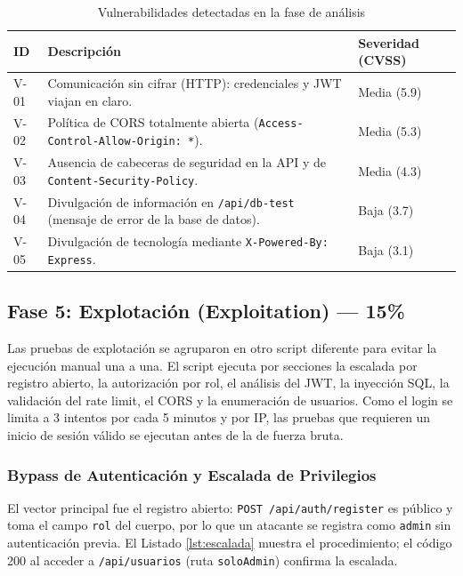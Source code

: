 \documentclass[stu,11pt,spanish,floatsintext]{apa7}
\begin{document}
\begin{table}[H]
  \centering
  \caption{Vulnerabilidades detectadas en la fase de análisis}
  \label{tab:vulns}
  \begin{tabularx}{\textwidth}{l X l}
    \toprule
    \textbf{ID} & \textbf{Descripción} & \textbf{Severidad (CVSS)} \\
    \midrule
    V-01 & Comunicación sin cifrar (HTTP): credenciales y JWT viajan en claro. & Media (5.9) \\
    V-02 & Política de CORS totalmente abierta (\texttt{Access-Control-Allow-Origin: *}). & Media (5.3) \\
    V-03 & Ausencia de cabeceras de seguridad en la API y de \texttt{Content-Security-Policy}. & Media (4.3) \\
    V-04 & Divulgación de información en \texttt{/api/db-test} (mensaje de error de la base de datos). & Baja (3.7) \\
    V-05 & Divulgación de tecnología mediante \texttt{X-Powered-By: Express}. & Baja (3.1) \\
    \bottomrule
  \end{tabularx}
\end{table}

\subsection{Fase 5: Explotación (Exploitation) — 15\%}
Las pruebas de explotación se agruparon en otro script diferente para evitar la ejecución manual una a una. El script ejecuta por secciones la escalada por registro abierto, la autorización por rol, el análisis del JWT, la inyección SQL, la validación del rate limit, el CORS y la enumeración de usuarios. Como el login se limita a 3 intentos por cada 5 minutos y por IP, las pruebas que requieren un inicio de sesión válido se ejecutan antes de la de fuerza bruta.

\subsubsection{Bypass de Autenticación y Escalada de Privilegios}

El vector principal fue el registro abierto: \texttt{POST /api/auth/register} es público y toma el campo \texttt{rol} del cuerpo, por lo que un atacante se registra como \texttt{admin} sin autenticación previa. El Listado \ref{lst:escalada} muestra el procedimiento; el código 200 al acceder a \texttt{/api/usuarios} (ruta \texttt{soloAdmin}) confirma la escalada.
\end{document}
